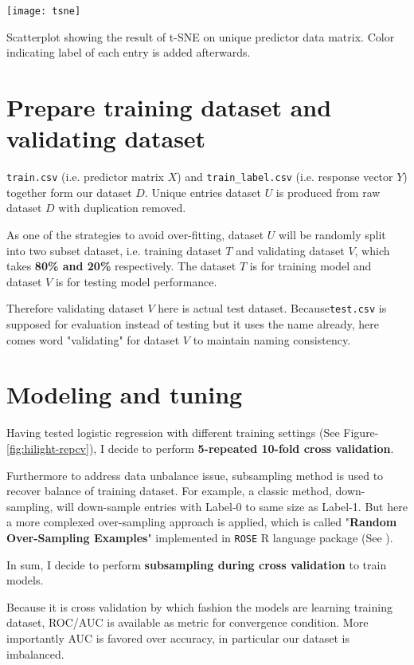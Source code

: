\begin{marginfigure}
\centering
	\texttt{[image: tsne]}
	\caption{Scatterplot showing the result of t-SNE on unique predictor data matrix. Color indicating label of each entry is added afterwards. }
	\label{fig:tsne}
\end{marginfigure}

\section{Prepare training dataset and validating dataset}

\texttt{train.csv} (i.e. predictor matrix $X$) and \texttt{train\_label.csv} (i.e. response vector $Y$) together form our dataset $D$. Unique entries dataset $U$ is produced from raw dataset $D$ with duplication removed. 

As one of the strategies to avoid over-fitting, dataset $U$ will be randomly split into two subset dataset, i.e. training dataset $T$ and validating dataset $V$, which takes \textbf{80\% and 20\% }respectively. The dataset $T$ is for training model and dataset $V$ is for testing model performance. 

Therefore validating dataset $V$ here is actual test dataset. Because\texttt{test.csv} is supposed for evaluation instead of testing but it uses the name already, here comes word "validating" for dataset $V$ to maintain naming consistency. 

\section{Modeling and tuning}
Having tested logistic regression with different training settings (See  Figure-\ref{fig:hilight-repcv}), I decide to perform \textbf{5-repeated 10-fold cross validation}. 

Furthermore to address data unbalance issue, subsampling method is used to recover balance of training dataset. For example, a classic method, down-sampling, will down-sample entries with Label-0 to same size as Label-1. But here a more complexed over-sampling approach is applied, which is called "\textbf{Random Over-Sampling Examples}" implemented in \texttt{ROSE} R language package (See ). 

In sum, I decide to perform \textbf{subsampling during cross validation} to train models. %

Because it is cross validation by which fashion the models are learning training dataset, ROC/AUC is available as metric for convergence condition. More importantly AUC is favored over accuracy, in particular our dataset is imbalanced. 

